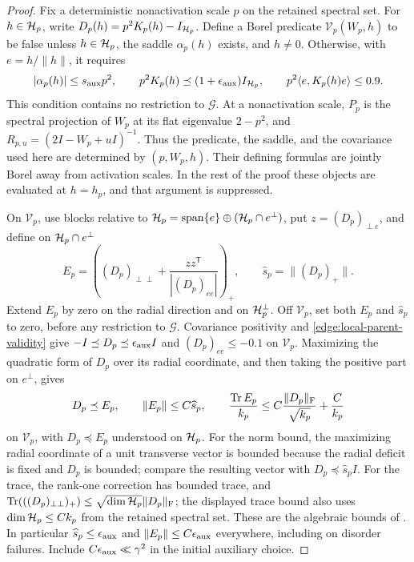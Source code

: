 \begin{proof}
Fix a deterministic nonactivation scale \(p\) on the retained spectral
set.  For \(h\in\mathcal H_p\), write \(D_p(h)=p^2K_p(h)-I_{\mathcal H_p}\).
Define a Borel predicate \(\mathcal V_p(W_p,h)\) to be false unless
\(h\in\mathcal H_p\), the saddle \(\alpha_p(h)\) exists, and \(h\ne0\).
Otherwise, with \(e=h/\|h\|\), it requires
\begin{equation}\label{edge:local-parent-validity}
 |\alpha_p(h)|\le s_{\rm aux}p^2,\qquad
 p^2K_p(h)\preceq(1+\epsilon_{\rm aux})I_{\mathcal H_p},\qquad
 p^2\langle e,K_p(h)e\rangle\le0.9.
\end{equation}
This condition contains no restriction to \(\mathcal G\).  At a
nonactivation scale, \(P_p\) is the spectral projection of \(W_p\)
at its flat eigenvalue \(2-p^2\), and
\(R_{p,u}=(2I-W_p+uI)^{-1}\).  Thus the predicate, the saddle, and the
covariance used here are determined by \((p,W_p,h)\).
Their defining formulas are jointly Borel away from activation scales.
In the rest of the proof these objects are evaluated at \(h=h_p\),
and that argument is suppressed.

On \(\mathcal V_p\), use blocks relative to
\(\mathcal H_p=\operatorname{span}\{e\}\oplus(\mathcal H_p\cap e^\perp)\), put
\(z=(D_p)_{\perp e}\), and define on \(\mathcal H_p\cap e^\perp\)
\begin{equation}\label{edge:tangent-error}
 E_p=\left((D_p)_{\perp\perp}
             +\frac{zz^{\mathsf T}}{|(D_p)_{ee}|}\right)_+,
 \qquad \widehat s_p=\|(D_p)_+\|.
\end{equation}
Extend \(E_p\) by zero on the radial direction and on \(\mathcal H_p^\perp\).
Off \(\mathcal V_p\), set both \(E_p\) and \(\widehat s_p\) to zero,
before any restriction to \(\mathcal G\).  Covariance positivity and
\eqref{edge:local-parent-validity} give
\(-I\preceq D_p\preceq\epsilon_{\rm aux}I\) and
\((D_p)_{ee}\le-0.1\) on \(\mathcal V_p\).
Maximizing the quadratic form of \(D_p\) over its radial coordinate,
and then taking the positive part on \(e^\perp\), gives
\begin{equation}\label{edge:tangent-bounds}
 D_p\preceq E_p,\qquad
 \|E_p\|\le C\widehat s_p,\qquad
 \frac{\operatorname{Tr} E_p}{k_p}
       \le C\frac{\|D_p\|_{\rm F}}{\sqrt{k_p}}+\frac C{k_p}
\end{equation}
on \(\mathcal V_p\), with \(D_p\preceq E_p\) understood on \(\mathcal H_p\).
For the norm bound, the maximizing radial coordinate
of a unit transverse vector is bounded because the radial deficit is
fixed and \(D_p\) is bounded; compare the resulting vector with
\(D_p\preceq\widehat s_pI\).  For the trace, the rank-one correction
has bounded trace, and
\(\operatorname{Tr}(((D_p)_{\perp\perp})_+)\le
\sqrt{\dim\mathcal H_p}\|D_p\|_{\rm F}\); the displayed trace bound also
uses \(\dim\mathcal H_p\le Ck_p\) from the retained spectral set.
These are the algebraic bounds of \cite[Lemma~4.4, Equation~(4.4)]{FUA}.
In particular \(\widehat s_p\le\epsilon_{\rm aux}\) and
\(\|E_p\|\le C\epsilon_{\rm aux}\) everywhere, including on disorder failures.
Include \(C\epsilon_{\rm aux}\ll\gamma^2\) in the initial auxiliary choice.


\end{proof}
